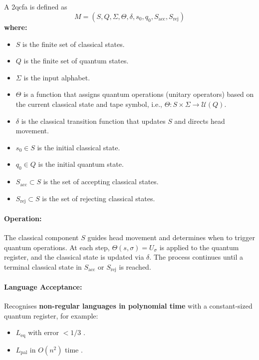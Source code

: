 \subsection{}
\label{subsec:2qcfa}
\begin{definition}
A \gls{2qcfa} is defined as 
\[
M = (S, Q, \Sigma, \Theta, \delta, s_0, q_0, S_{\text{acc}}, S_{\text{rej}})
\]
\textbf{where:}
\begin{itemize}
    \item \( S \) is the finite set of classical states.
    \item \( Q \) is the finite set of quantum states.
    \item \( \Sigma \) is the input alphabet.
    \item \( \Theta \) is a function that assigns quantum operations (unitary operators) based on the current classical state and tape symbol, i.e., \(\Theta: S \times \Sigma \to \mathcal{U}(Q)\).
    \item \( \delta \) is the classical transition function that updates \( S \) and directs head movement.
    \item \( s_0 \in S \) is the initial classical state.
    \item \( q_0 \in Q \) is the initial quantum state.
    \item \( S_{\text{acc}} \subset S \) is the set of accepting classical states.
    \item \( S_{\text{rej}} \subset S \) is the set of rejecting classical states.
\end{itemize}
\end{definition}

\paragraph{Operation:}  
The classical component \( S \) guides head movement and determines when to trigger quantum operations. At each step, \( \Theta(s, \sigma) = U_\sigma \) is applied to the quantum register, and the classical state is updated via \( \delta \). The process continues until a terminal classical state in \( S_{\text{acc}} \) or \( S_{\text{rej}} \) is reached.

\paragraph{Language Acceptance:}  
Recognises \textbf{non-regular languages in polynomial time} with a constant-sized quantum register, for example:
\begin{itemize}
    \item \( L_{\text{eq}} \) with error \( < 1/3 \) \cite{ambainis2002quantum}.
    \item \( L_{\text{pal}} \) in \( O(n^2) \) time \cite{yamakami2014constant}.
\end{itemize}


